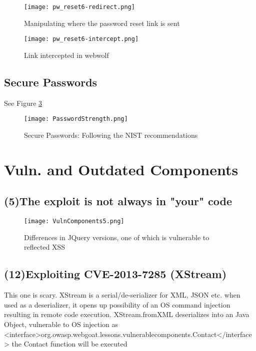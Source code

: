 \documentclass[
	letterpaper, %
	10pt, %
	unnumberedsections, %
	twoside, %
]{APAAssignment}
\begin{document}
\begin{appendices}
\begin{figure}[!htp] %
	\centering
	\texttt{[image: pw\_reset6-redirect.png]}
	\caption{Manipulating where the password reset link is sent}
	\label{fig:app:pwreset-redirect}
\end{figure}

\begin{figure}[!htp] %
	\centering
	\texttt{[image: pw\_reset6-intercept.png]}
	\caption{Link intercepted in webwolf}
	\label{fig:app:pwreset-intercept}
\end{figure}


\subsection{Secure Passwords}
See Figure \ref{fig:app:SecurePW}

\begin{figure}[!htp] %
	\centering
	\texttt{[image: PasswordStrength.png]}
	\caption{Secure Passwords: Following the NIST recommendations}
	\label{fig:app:SecurePW}
\end{figure}


\section{Vuln. and Outdated Components}\label{app:VulnAndOutdatedComponents}
\subsection{(5)The exploit is not always in "your" code}\label{app:VulnAndOutdatedComponents5}

\begin{figure}[!ht] %
	\centering
	\texttt{[image: VulnComponents5.png]}
	\caption{Differences in JQuery versions, one of which is vulnerable to reflected XSS }
	\label{fig:app:vuln5}
\end{figure}

\subsection{(12)Exploiting CVE-2013-7285 (XStream)}\label{app:VulnAndOutdatedComponents12}
This one is scary. XStream is a serial/de-serializer for XML, JSON etc. when used as a deserializer, it opens up possibility of an OS command injection resulting in remote code execution. XStream.fromXML deserializes into an Java Object, vulnerable to OS injection as <interface>org.owasp.webgoat.lessons.vulnerablecomponents.Contact</interface> the Contact function will be executed   


\end{appendices}
\end{document}

